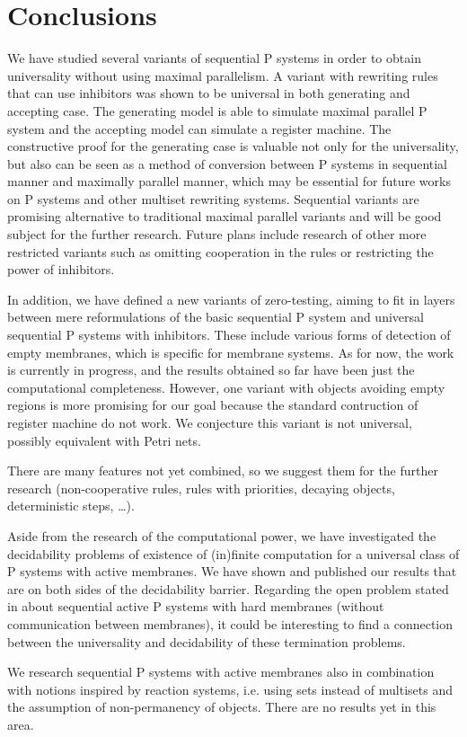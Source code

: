 \chapter*{Conclusions}
We have studied several variants of sequential P systems in order to obtain universality without using maximal parallelism. A variant with rewriting rules that can use inhibitors was shown to be universal in both generating and accepting case. The generating model is able to simulate maximal parallel P system and the accepting model can simulate a register machine.
The constructive proof for the generating case is valuable not only for the universality, but also can be seen as a method of conversion between P systems in sequential manner and maximally parallel manner, which may be essential for future works on P systems and other multiset rewriting systems. Sequential variants are promising alternative to traditional maximal parallel variants and will be good subject for the further research. Future plans include research of other more restricted variants such as omitting cooperation in the rules or restricting the power of inhibitors.

In addition, we have defined a new variants of zero-testing, aiming to fit in layers between mere reformulations of the basic sequential P system and universal sequential P systems with inhibitors. These include various forms of detection of empty membranes, which is specific for membrane systems. As for now, the work is currently in progress, and the results obtained so far have been just the computational completeness. However, one variant with objects avoiding empty regions is more promising for our goal because the standard contruction of register machine do not work. We conjecture this variant is not universal, possibly equivalent with Petri nets.

There are many features not yet combined, so we suggest them for the further research (non-cooperative rules, rules with priorities, decaying objects, deterministic steps, \ldots).

Aside from the research of the computational power, we have investigated the decidability problems of existence of (in)finite computation for a universal class of P systems with active membranes. We have shown and published our results that are on both sides of the decidability barrier. Regarding the open problem stated in \cite{Ibarra05Active} about sequential active P systems with hard membranes (without communication between membranes), it could be interesting to find a connection between the universality and decidability of these termination problems.

We research sequential P systems with active membranes also in combination with notions inspired by reaction systems, i.e. using sets instead of multisets and the assumption of non-permanency of objects. There are no results yet in this area.